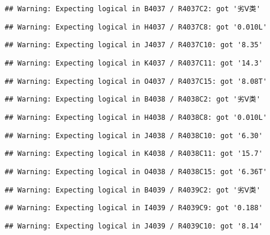 \documentclass[
]{article}
\begin{document}
\begin{verbatim}
## Warning: Expecting logical in B4037 / R4037C2: got '劣Ⅴ类'
\end{verbatim}

\begin{verbatim}
## Warning: Expecting logical in H4037 / R4037C8: got '0.010L'
\end{verbatim}

\begin{verbatim}
## Warning: Expecting logical in J4037 / R4037C10: got '8.35'
\end{verbatim}

\begin{verbatim}
## Warning: Expecting logical in K4037 / R4037C11: got '14.3'
\end{verbatim}

\begin{verbatim}
## Warning: Expecting logical in O4037 / R4037C15: got '8.08T'
\end{verbatim}

\begin{verbatim}
## Warning: Expecting logical in B4038 / R4038C2: got '劣Ⅴ类'
\end{verbatim}

\begin{verbatim}
## Warning: Expecting logical in H4038 / R4038C8: got '0.010L'
\end{verbatim}

\begin{verbatim}
## Warning: Expecting logical in J4038 / R4038C10: got '6.30'
\end{verbatim}

\begin{verbatim}
## Warning: Expecting logical in K4038 / R4038C11: got '15.7'
\end{verbatim}

\begin{verbatim}
## Warning: Expecting logical in O4038 / R4038C15: got '6.36T'
\end{verbatim}

\begin{verbatim}
## Warning: Expecting logical in B4039 / R4039C2: got '劣Ⅴ类'
\end{verbatim}

\begin{verbatim}
## Warning: Expecting logical in I4039 / R4039C9: got '0.188'
\end{verbatim}

\begin{verbatim}
## Warning: Expecting logical in J4039 / R4039C10: got '8.14'
\end{verbatim}
\end{document}

